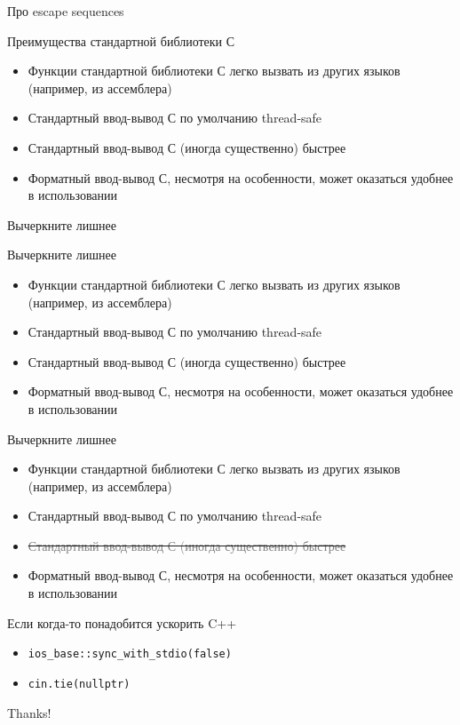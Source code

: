 \documentclass[10pt,pdf,hyperref={unicode}]{beamer}
\begin{document}
\begin{frame}{Про escape sequences}
    \center{}
\end{frame}

\begin{frame}{Преимущества стандартной библиотеки С}
    \begin{itemize}
        \item Функции стандартной библиотеки С легко вызвать из других языков (например, из ассемблера)
        \item Стандартный ввод-вывод С по умолчанию thread-safe
        \item Стандартный ввод-вывод С (иногда существенно) быстрее
        \item Форматный ввод-вывод С, несмотря на особенности, может оказаться удобнее в использовании
    \end{itemize}
\end{frame}

\begin{frame}
    \center\huge{Вычеркните лишнее}
\end{frame}

\begin{frame}{Вычеркните лишнее}
    \begin{itemize}
        \item Функции стандартной библиотеки С легко вызвать из других языков (например, из ассемблера)
        \item Стандартный ввод-вывод С по умолчанию thread-safe
        \item Стандартный ввод-вывод С (иногда существенно) быстрее
        \item Форматный ввод-вывод С, несмотря на особенности, может оказаться удобнее в использовании
    \end{itemize}
\end{frame}

\begin{frame}{Вычеркните лишнее}
    \begin{itemize}
        \item Функции стандартной библиотеки С легко вызвать из других языков (например, из ассемблера)
        \item Стандартный ввод-вывод С по умолчанию thread-safe
        \item \sout{\textcolor{gray}{Стандартный ввод-вывод С (иногда существенно) быстрее}}
        \item Форматный ввод-вывод С, несмотря на особенности, может оказаться удобнее в использовании
    \end{itemize}
\end{frame}

\begin{frame}{Если когда-то понадобится ускорить C++}
    \begin{itemize}
        \item \lstinline{ios_base::sync_with_stdio(false)}
        \item \lstinline{cin.tie(nullptr)}
    \end{itemize}
\end{frame}

\begin{frame}{}
    \begin{center}
        \Huge{Thanks!}
    \end{center}
\end{frame}
\end{document}
